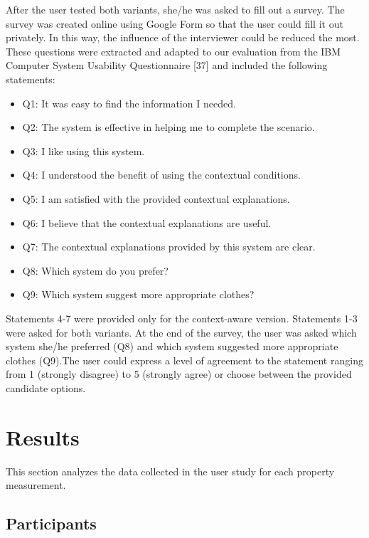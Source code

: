 \begin{enumerate}
After the user tested both variants, she/he was asked to fill out a survey. The survey was created online using Google Form so that the user could fill it out privately. In this way, the influence of the interviewer could be reduced the most. These questions were extracted and adapted to our evaluation from the IBM Computer System Usability Questionnaire [37] and included the following statements:

\begin{itemize}
\item{Q1: It was easy to find the information I needed. }
\item{Q2: The system is effective in helping me to complete the scenario. }
\item{Q3: I like using this system.}
\item{Q4: I understood the benefit of using the contextual conditions. }
\item{Q5: I am satisfied with the provided contextual explanations. }
\item{Q6: I believe that the contextual explanations are useful.}
\item{Q7: The contextual explanations provided by this system are clear. }
\item{Q8: Which system do you prefer?}
\item{Q9: Which system suggest more appropriate clothes?}
\end{itemize}

Statements 4-7 were provided only for the context-aware version. Statements 1-3 were asked for both variants. At the end of the survey, the user was asked which system she/he preferred (Q8) and which system suggested more appropriate clothes (Q9).The user could express a level of agreement to the statement ranging from 1 (strongly disagree) to 5 (strongly agree) or choose between the provided candidate options. 

\end{enumerate}

\section{Results} \label{sec:results}

This section analyzes the data collected in the user study for each property measurement.

\subsection{Participants} \label{sec:results_p}

